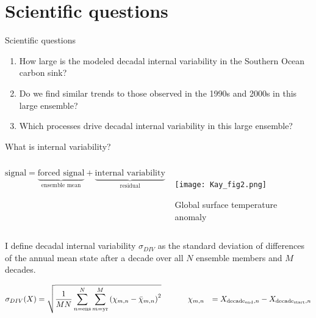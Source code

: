 \documentclass[aspectratio=169]{beamer}
\begin{document}
\section{Scientific questions}
\begin{frame}{Scientific questions}
\Large
	\begin{enumerate}[<+->]
	\item How large is the modeled decadal internal variability in the Southern Ocean carbon sink?
	\item Do we find similar trends to those observed in the 1990s and 2000s in this large ensemble?
	\item Which processes drive decadal internal variability in this large ensemble?
	\end{enumerate}
\end{frame}

\begin{frame}{What is internal variability?}
\label{sec:DIV}
\vspace{-1cm}
 \begin{columns}
            \[ \text{signal}=\underbrace{\text{forced signal}}_{\text{ensemble mean}}+\underbrace{\text{internal variability}}_{\text{residual}}\]
			\small         
				\begin{figure}
 					\centering
             		\texttt{[image: Kay\_fig2.png]}
              		\caption{Global surface temperature anomaly \citep{Kay2015}}
				\end{figure}           
         
         \end{columns} 


\pause
I define decadal internal variability $\sigma_{DIV}$ as the standard deviation of differences of the annual mean state after a decade over all $N$ ensemble members and $M$ decades.

\vspace{-2mm}
\begin{align*}
\sigma_{DIV}(X) &= \sqrt{\frac{1}{M N} \sum_{n=\text{ens}}^{N} \sum_{m=\text{yr}}^{M} \left( \chi_{m,n} -\bar{\chi}_{m,n}\right)^{2}} \hspace{12mm}
\chi_{m,n}&=X_{\text{decade}_{\text{end}},n}-X_{\text{decade}_{\text{start}},n}
\end{align*}
\end{frame}
\end{document}
